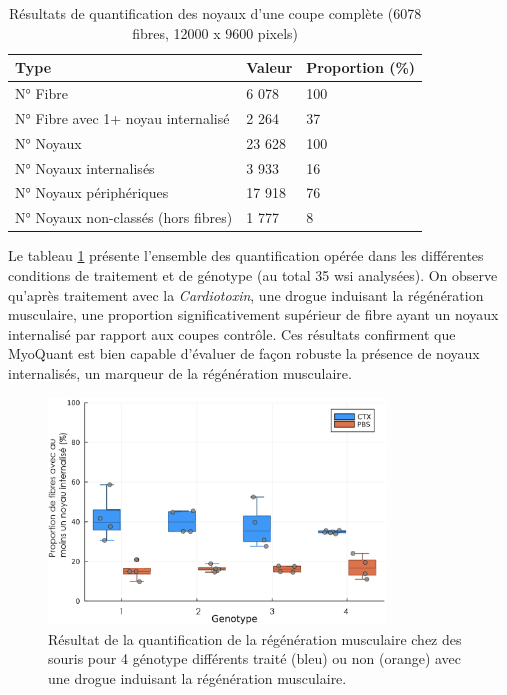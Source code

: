 \begin{table}[htbp]
\centering
\caption{Résultats de quantification des noyaux d'une coupe complète (6078 fibres, 12000 x 9600 pixels)}
\label{tab:myoquant_fluo_results}
\begin{tabularx}{\textwidth}{|X|X|X|}
\hline
\textbf{Type} & \textbf{Valeur} & \textbf{Proportion (\%)} \\
\toprule
N° Fibre & 6 078 & 100 \\
\hline
N° Fibre avec 1+ noyau internalisé & 2 264 & 37 \\
\hline
\hline
N° Noyaux & 23 628 & 100 \\
\hline
N° Noyaux internalisés & 3 933 & 16 \\
\hline
N° Noyaux périphériques & 17 918 & 76 \\
\hline
N° Noyaux non-classés (hors fibres) & 1 777 & 8 \\
\hline
\end{tabularx}
\end{table}
Le tableau \ref{fig:fluo_compil} présente l'ensemble des quantification opérée dans les différentes conditions de traitement et de génotype (au total 35 \gls{wsi} analysées). On observe qu'après traitement avec la \textit{Cardiotoxin}, une drogue induisant la régénération musculaire, une proportion significativement supérieur de fibre ayant un noyaux internalisé par rapport aux coupes contrôle. Ces résultats confirment que MyoQuant est bien capable d'évaluer de façon robuste la présence de noyaux internalisés, un marqueur de la régénération musculaire.

\begin{figure}[htbp]
 \centering
 \includegraphics[width=0.8\textwidth]{figures/fluo_compil.png}
 \caption[Résultat de la quantification de la régénération musculaire]{Résultat de la quantification de la régénération musculaire chez des souris pour 4 génotype différents traité (bleu) ou non (orange) avec une drogue induisant la régénération musculaire.}
 \label{fig:fluo_compil}
\end{figure}


